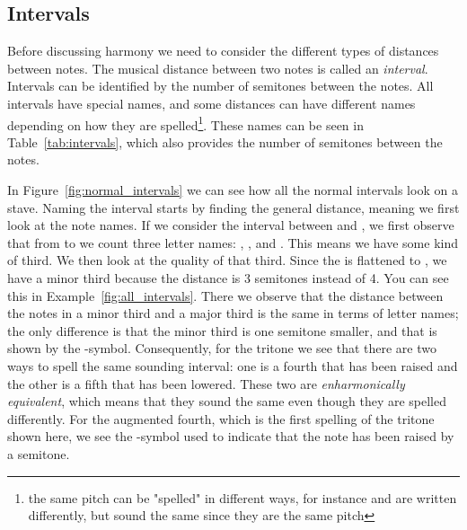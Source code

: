 
  \subsection{Intervals}
    Before discussing harmony we need to consider the different types of distances between notes. The musical distance between two notes is called an \textit{interval}. Intervals can be identified by the number of semitones between the notes. All intervals have special names, and some distances can have different names depending on how they are spelled\footnote{the same pitch can be "spelled" in different ways, for instance  and  are written differently, but sound the same since they are the same pitch}. These names can be seen in Table~\ref{tab:intervals}, which also provides the number of semitones between the notes.

    In Figure~\ref{fig:normal_intervals} we can see how all the normal intervals look on a stave. Naming the interval starts by finding the general distance, meaning we first look at the note names. If we consider the interval between  and , we first observe that from  to  we count three letter names: , , and . This means we have some kind of third. We then look at the quality of that third. Since the  is flattened to , we have a minor third because the distance is 3 semitones instead of 4. You can see this in Example~\ref{fig:all_intervals}. There we observe that the distance between the notes in a minor third and a major third is the same in terms of letter names; the only difference is that the minor third is one semitone smaller, and that is shown by the \musFlat{}-symbol. Consequently, for the tritone we see that there are two ways to spell the same sounding interval: one is a fourth that has been raised and the other is a fifth that has been lowered. These two are \textit{enharmonically equivalent}, which means that they sound the same even though they are spelled differently. For the augmented fourth, which is the first spelling of the tritone shown here, we see the \musSharp{}-symbol used to indicate that the note has been raised by a semitone.


